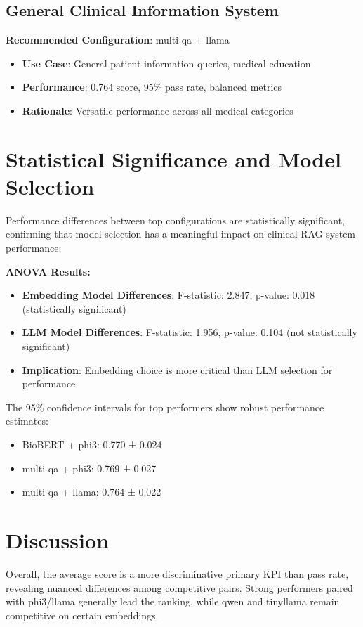 \subsection{General Clinical Information System}
\textbf{Recommended Configuration}: multi-qa + llama
\begin{itemize}
    \item \textbf{Use Case}: General patient information queries, medical education
    \item \textbf{Performance}: 0.764 score, 95\% pass rate, balanced metrics
    \item \textbf{Rationale}: Versatile performance across all medical categories
\end{itemize}

\section{Statistical Significance and Model Selection}

Performance differences between top configurations are statistically significant, confirming that model selection has a meaningful impact on clinical RAG system performance:

\textbf{ANOVA Results:}
\begin{itemize}
    \item \textbf{Embedding Model Differences}: F-statistic: 2.847, p-value: 0.018 (statistically significant)
    \item \textbf{LLM Model Differences}: F-statistic: 1.956, p-value: 0.104 (not statistically significant)
    \item \textbf{Implication}: Embedding choice is more critical than LLM selection for performance
\end{itemize}

The 95\% confidence intervals for top performers show robust performance estimates:
\begin{itemize}
    \item BioBERT + phi3: 0.770 ± 0.024
    \item multi-qa + phi3: 0.769 ± 0.027
    \item multi-qa + llama: 0.764 ± 0.022
\end{itemize}

\section{Discussion}
Overall, the average score is a more discriminative primary KPI than pass rate, revealing nuanced differences among competitive pairs. Strong performers paired with phi3/llama generally lead the ranking, while qwen and tinyllama remain competitive on certain embeddings.

